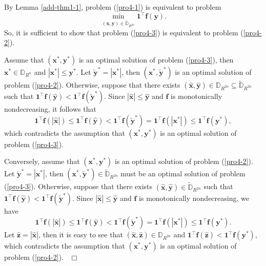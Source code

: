 \documentclass[12pt]{article}
\def \ep{\hbox{ }\hfill$\Box$}
\def\reff#1{{\rm(\ref{#1})}}
\begin{document}
By Lemma \ref{add-thm1-1},  problem \reff{pro4-1} is equivalent to problem
\begin{equation}\label{pro4-3}
\min_{(\mathbf{x},\mathbf{y}) \in \tilde{\mathbb{D}}_{R^{2n}}}\mathbf{1}^{\top}\mathbf{f}(\mathbf{y}).
\end{equation}
So, it is sufficient to show that problem (\ref{pro4-3}) is equivalent
to problem (\ref{pro4-2}).

Assume that $(\mathbf{x}^{\ast},\mathbf{y}^{\ast})$ is an optimal solution of problem (\ref{pro4-3}), then $\mathbf{x}^{\ast}\in \mathbb{D}_{R^{n}}$ and $|\mathbf{x}^{\ast}|\leqslant\mathbf{y}^{\ast}$. Let $\tilde{\mathbf{y}}^{\ast}=|\mathbf{x}^{\ast}|$, then $(\mathbf{x}^{\ast}, \tilde{\mathbf{y}}^{\ast})$ is an optimal solution of problem (\ref{pro4-2}). Otherwise, suppose that there exists $(\hat{\mathbf{x}},\hat{\mathbf{y}})\in\mathbb{D}_{R^{2n}}\subseteq\tilde{\mathbb{D}}_{R^{2n}}$ such that $\mathbf{1}^{\top}\mathbf{f}(\hat{\mathbf{y}})<\mathbf{1}^{\top}\mathbf{f}(\tilde{\mathbf{y}}^\ast)$. Since $|\hat{\mathbf{x}}|\leqslant\hat{\mathbf{y}}$ and $\mathbf{f}$ is monotonically nondecreasing, it follows that
$$
\mathbf{1}^{\top}\mathbf{f}(|\hat{\mathbf{x}}|) \leqslant\mathbf{1}^{\top}\mathbf{f}(\hat{\mathbf{y}}) <\mathbf{1}^{\top}\mathbf{f}(\tilde{\mathbf{y}}^\ast)
 =\mathbf{1}^{\top}\mathbf{f}(|\mathbf{x}^\ast|)\leqslant \mathbf{1}^{\top}\mathbf{f}(\mathbf{y}^{\ast}),
$$
which contradicts the assumption that $(\mathbf{x}^{\ast},\mathbf{y}^{\ast})$ is an optimal solution of problem (\ref{pro4-3}).

Conversely, assume that $(\mathbf{x}^\ast,\mathbf{y}^\ast)$ is an optimal solution of problem (\ref{pro4-2}). Let $\tilde{\mathbf{y}}^\ast=|\mathbf{x}^\ast|$, then $(\mathbf{x}^\ast, \tilde{\mathbf{y}}^\ast)\in\tilde{\mathbb{D}}_{R^{2n}}$ must be an optimal solution of problem (\ref{pro4-3}). Otherwise, suppose that there exists $(\hat{\mathbf{x}},\hat{\mathbf{y}})\in\tilde{\mathbb{D}}_{R^{2n}}$ such that
$\mathbf{1}^{\top}\mathbf{f}(\hat{\mathbf{y}})<\mathbf{1}^{\top}\mathbf{f}(\tilde{\mathbf{y}}^\ast)$.
Since $ |\hat{\mathbf{x}}|\leqslant\hat{\mathbf{y}}$ and
$\mathbf{f}$ is monotonically nondecreasing, we have
$$
\mathbf{1}^{\top}\mathbf{f}(|\hat{\mathbf{x}}|)
\leqslant\mathbf{1}^{\top}\mathbf{f}(\hat{\mathbf{y}})<
\mathbf{1}^{\top}\mathbf{f}(\tilde{\mathbf{y}}^{\ast}) =\mathbf{1}^{\top}\mathbf{f}(|\mathbf{x}^\ast|) \leqslant\mathbf{1}^{\top}\mathbf{f}(\mathbf{y}^{\ast}).
$$
Let $\hat{\mathbf{\mathbf{z}}}=|\hat{\mathbf{x}}|$, then it is easy to see that $(\hat{\mathbf{x}}, \hat{\mathbf{z}})\in \mathbb{D}_{R^{2n}}$ and
$\mathbf{1}^{\top}\mathbf{f}(\hat{\mathbf{z}})<\mathbf{1}^{\top}\mathbf{f}(\mathbf{y}^\ast)$,
which contradicts the assumption that $(\mathbf{x}^{\ast},\mathbf{y}^{\ast})$ is an optimal solution of problem (\ref{pro4-2}).
\ep
\end{document}
